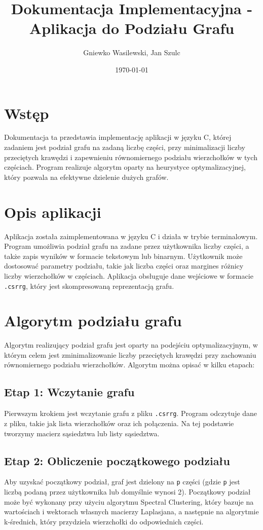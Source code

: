 \documentclass[a4paper,12pt]{article}
\title{Dokumentacja Implementacyjna - Aplikacja do Podziału Grafu}
\author{Gniewko Wasilewski, Jan Szulc}
\date{\today}
\begin{document}
\maketitle

\section{Wstęp}
Dokumentacja ta przedstawia implementację aplikacji w języku C, której zadaniem jest podział grafu na zadaną liczbę części, przy minimalizacji liczby przeciętych krawędzi i zapewnieniu równomiernego podziału wierzchołków w tych częściach. Program realizuje algorytm oparty na heurystyce optymalizacyjnej, który pozwala na efektywne dzielenie dużych grafów.

\section{Opis aplikacji}

Aplikacja została zaimplementowana w języku C i działa w trybie terminalowym. Program umożliwia podział grafu na zadane przez użytkownika liczby części, a także zapis wyników w formacie tekstowym lub binarnym. Użytkownik może dostosować parametry podziału, takie jak liczba części oraz margines różnicy liczby wierzchołków w częściach. Aplikacja obsługuje dane wejściowe w formacie \texttt{.csrrg}, który jest skompresowaną reprezentacją grafu.
\newpage
\section{Algorytm podziału grafu}

Algorytm realizujący podział grafu jest oparty na podejściu optymalizacyjnym, w którym celem jest zminimalizowanie liczby przeciętych krawędzi przy zachowaniu równomiernego podziału wierzchołków. Algorytm można opisać w kilku etapach:

\subsection{Etap 1: Wczytanie grafu}
Pierwszym krokiem jest wczytanie grafu z pliku \texttt{.csrrg}. Program odczytuje dane z pliku, takie jak lista wierzchołków oraz ich połączenia. Na tej podstawie tworzymy macierz sąsiedztwa lub listy sąsiedztwa.

\subsection{Etap 2: Obliczenie początkowego podziału}
Aby uzyskać początkowy podział, graf jest dzielony na \texttt{p} części (gdzie \texttt{p} jest liczbą podaną przez użytkownika lub domyślnie wynosi 2). Początkowy podział może być wykonany przy użyciu algorytmu Spectral Clustering, który bazuje na wartościach i wektorach własnych macierzy Laplasjana, a następnie na algorytmie k-średnich, który przydziela wierzchołki do odpowiednich części.
\end{document}
